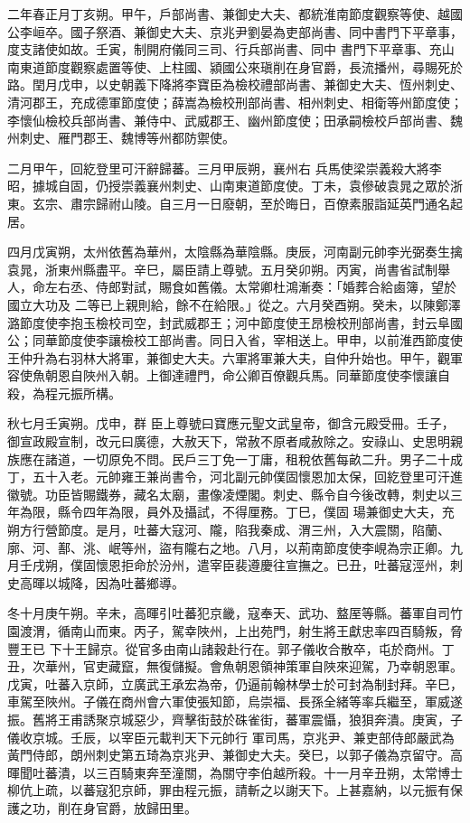 \begin{pinyinscope}
 二年春正月丁亥朔。甲午，戶部尚書、兼御史大夫、都統淮南節度觀察等使、越國公李峘卒。國子祭酒、兼御史大夫、京兆尹劉晏為吏部尚書、同中書門下平章事，度支諸使如故。壬寅，制開府儀同三司、行兵部尚書、同中
 書門下平章事、充山南東道節度觀察處置等使、上柱國、潁國公來瑱削在身官爵，長流播州，尋賜死於路。閏月戊申，以史朝義下降將李寶臣為檢校禮部尚書、兼御史大夫、恆州刺史、清河郡王，充成德軍節度使；薛嵩為檢校刑部尚書、相州刺史、相衛等州節度使；李懷仙檢校兵部尚書、兼侍中、武威郡王、幽州節度使；田承嗣檢校戶部尚書、魏州刺史、雁門郡王、魏博等州都防禦使。



 二月甲午，回紇登里可汗辭歸蕃。三月甲辰朔，襄州右
 兵馬使梁崇義殺大將李昭，據城自固，仍授崇義襄州刺史、山南東道節度使。丁未，袁傪破袁晁之眾於浙東。玄宗、肅宗歸祔山陵。自三月一日廢朝，至於晦日，百僚素服詣延英門通名起居。



 四月戊寅朔，太州依舊為華州，太陰縣為華陰縣。庚辰，河南副元帥李光弼奏生擒袁晁，浙東州縣盡平。辛巳，屬臣請上尊號。五月癸卯朔。丙寅，尚書省試制舉人，命左右丞、侍郎對試，賜食如舊儀。太常卿杜鴻漸奏：「婚葬合給鹵簿，望於國立大功及
 二等已上親則給，餘不在給限。」從之。六月癸酉朔。癸未，以陳鄭澤潞節度使李抱玉檢校司空，封武威郡王；河中節度使王昂檢校刑部尚書，封云阜國公；同華節度使李讓檢校工部尚書。同日入省，宰相送上。甲申，以前淮西節度使王仲升為右羽林大將軍，兼御史大夫。六軍將軍兼大夫，自仲升始也。甲午，觀軍容使魚朝恩自陜州入朝。上御達禮門，命公卿百僚觀兵馬。同華節度使李懷讓自殺，為程元振所構。



 秋七月壬寅朔。戊申，群
 臣上尊號曰寶應元聖文武皇帝，御含元殿受冊。壬子，御宣政殿宣制，改元曰廣德，大赦天下，常赦不原者咸赦除之。安祿山、史思明親族應在諸道，一切原免不問。民戶三丁免一丁庸，租稅依舊每畝二升。男子二十成丁，五十入老。元帥雍王兼尚書令，河北副元帥僕固懷恩加太保，回紇登里可汗進徽號。功臣皆賜鐵券，藏名太廟，畫像凌煙閣。刺史、縣令自今後改轉，刺史以三年為限，縣令四年為限，員外及攝試，不得厘務。丁巳，僕固
 瑒兼御史大夫，充朔方行營節度。是月，吐蕃大寇河、隴，陷我秦成、渭三州，入大震關，陷蘭、廓、河、鄯、洮、岷等州，盜有隴右之地。八月，以荊南節度使李峴為宗正卿。九月壬戌朔，僕固懷恩拒命於汾州，遣宰臣裴遵慶往宣撫之。已丑，吐蕃寇涇州，刺史高暉以城降，因為吐蕃鄉導。



 冬十月庚午朔。辛未，高暉引吐蕃犯京畿，寇奉天、武功、盩厔等縣。蕃軍自司竹園渡渭，循南山而東。丙子，駕幸陜州，上出苑門，射生將王獻忠率四百騎叛，脅豐王已
 下十王歸京。從官多由南山諸穀赴行在。郭子儀收合散卒，屯於商州。丁丑，次華州，官吏藏竄，無復儲擬。會魚朝恩領神策軍自陜來迎駕，乃幸朝恩軍。戊寅，吐蕃入京師，立廣武王承宏為帝，仍逼前翰林學士於可封為制封拜。辛巳，車駕至陜州。子儀在商州會六軍使張知節，烏崇福、長孫全緒等率兵繼至，軍威遂振。舊將王甫誘聚京城惡少，齊擊街鼓於硃雀街，蕃軍震懾，狼狽奔潰。庚寅，子儀收京城。壬辰，以宰臣元載判天下元帥行
 軍司馬，京兆尹、兼吏部侍郎嚴武為黃門侍郎，朗州刺史第五琦為京兆尹、兼御史大夫。癸巳，以郭子儀為京留守。高暉聞吐蕃潰，以三百騎東奔至潼關，為關守李伯越所殺。十一月辛丑朔，太常博士柳伉上疏，以蕃寇犯京師，罪由程元振，請斬之以謝天下。上甚嘉納，以元振有保護之功，削在身官爵，放歸田里。




\end{pinyinscope}
